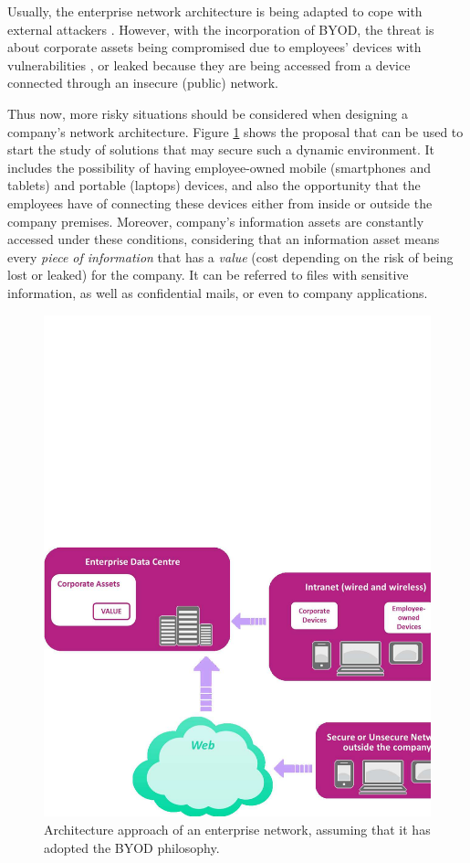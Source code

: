 Usually, the enterprise network architecture is being adapted to cope with external attackers \cite{MIT05}. However, with the incorporation of BYOD, the threat is about corporate assets being compromised due to employees' devices with vulnerabilities \cite{android11}, or leaked because they are being accessed from a device connected through an insecure (public) network.

Thus now, more risky situations should be considered when designing a company's network architecture. Figure \ref{fig:proposed_diagram} shows the proposal that can be used to start the study of solutions that may secure such a dynamic environment. It includes the possibility of having employee-owned mobile (smartphones and tablets) and portable (laptops) devices, and also the opportunity that the employees have of connecting these devices either from inside or outside the company premises. Moreover, company's information assets are constantly accessed under these conditions, considering that an information asset means every \textit{piece of information} that has a \textit{value} (cost depending on the risk of being lost or leaked) for the company. It can be referred to files with sensitive information, as well as confidential mails, or even to company applications.

\begin{figure}
\centering
	\includegraphics[scale =0.4] {gfx/byodSotA/proposedDiagram.pdf}
	\caption{Architecture approach of an enterprise network, assuming that it has adopted the BYOD philosophy.}
	\label{fig:proposed_diagram}
\end{figure}

